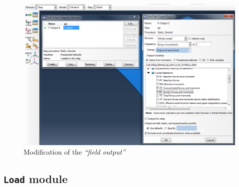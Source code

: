\documentclass[english,a4paper,12pt]{article}
\begin{document}
\begin{figure}[h!tp]
\centering
\includegraphics[scale=0.4]{capturas/16a-step.png}
\caption{Modification of the \emph{``field output''}}
\label{fig:field-output}
\end{figure}
\clearpage

\subsection{\texttt{Load} module}
\end{document}
